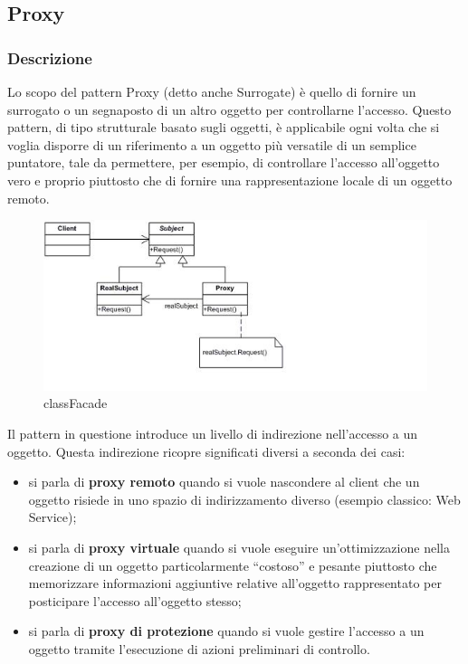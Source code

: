 \documentclass[a4paper,10pt]{article}
\begin{document}
            \subsection{Proxy}
            \subsubsection{Descrizione}
    
            Lo scopo del pattern Proxy (detto anche Surrogate) è quello di fornire un surrogato o un segnaposto di un altro oggetto per controllarne l’accesso. Questo pattern, di tipo strutturale basato sugli oggetti, è applicabile ogni volta che si voglia disporre di un riferimento a un oggetto più versatile di un semplice puntatore, tale da permettere, per esempio, di controllare l’accesso all’oggetto vero e proprio piuttosto che di fornire una rappresentazione locale di un oggetto remoto.

            \begin{figure}[h!] %
                \centering
                \includegraphics[scale=1]{img/IC119186}	
                \caption{classFacade}
            \end{figure}

            Il pattern in questione introduce un livello di indirezione nell’accesso a un oggetto. Questa indirezione ricopre significati diversi a seconda dei casi:
                    
            \begin{itemize}
                \item si parla di \textbf{proxy remoto} quando si vuole nascondere al client che un oggetto risiede in uno spazio di indirizzamento diverso (esempio classico: Web Service);
                \item si parla di \textbf{proxy virtuale} quando si vuole eseguire un’ottimizzazione nella creazione di un oggetto particolarmente “costoso” e pesante piuttosto che memorizzare informazioni aggiuntive relative all’oggetto rappresentato per posticipare l’accesso all’oggetto stesso;
                \item si parla di \textbf{proxy di protezione} quando si vuole gestire l’accesso a un oggetto tramite l’esecuzione di azioni preliminari di controllo.
                
            \end{itemize}
            
\end{document}
